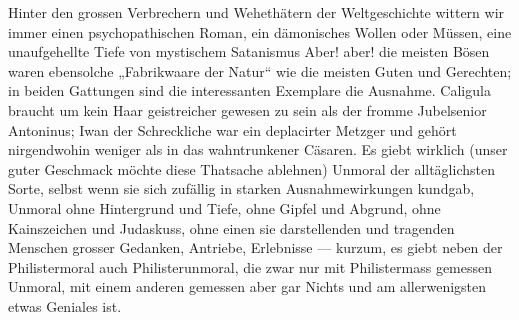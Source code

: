 Hinter den grossen Verbrechern und Wehethätern der Weltgeschichte wittern wir immer einen psychopathischen Roman, ein dämonisches Wollen oder Müssen, eine unaufgehellte Tiefe von mystischem Satanismus  Aber! aber! die meisten Bösen waren ebensolche „Fabrikwaare der Natur“ wie die meisten Guten und Gerechten; in beiden Gattungen sind die interessanten Exemplare die Ausnahme. Caligula braucht um kein Haar geistreicher gewesen zu sein als der fromme Jubelsenior Antoninus; Iwan der Schreckliche war ein deplacirter Metzger und gehört nirgendwohin weniger als in das  wahntrunkener Cäsaren. Es giebt wirklich (unser guter Geschmack möchte diese Thatsache ablehnen) Unmoral der alltäglichsten Sorte, selbst wenn sie sich zufällig in starken Ausnahmewirkungen kundgab, Unmoral ohne Hintergrund und Tiefe, ohne Gipfel und Abgrund, ohne Kainszeichen und Judaskuss, ohne einen sie darstellenden und tragenden Menschen grosser Gedanken, Antriebe, Erlebnisse — kurzum, es giebt neben der Philistermoral auch Philisterunmoral, die zwar nur mit Philistermass gemessen Unmoral, mit einem anderen gemessen aber gar Nichts und am allerwenigsten etwas Geniales ist.
\par

